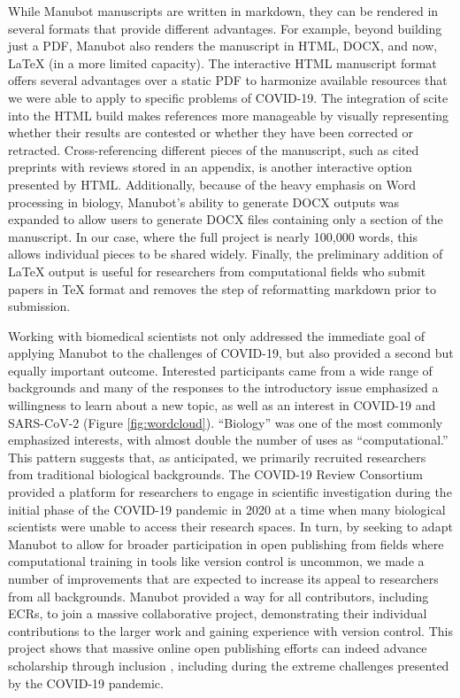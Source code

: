 \documentclass[sigconf]{acmart}
\begin{document}
While Manubot manuscripts are written in markdown, they can be rendered in several formats that provide different advantages.
For example, beyond building just a PDF, Manubot also renders the manuscript in HTML, DOCX, and now, LaTeX (in a more limited capacity).
The interactive HTML manuscript format offers several advantages over a static PDF to harmonize available resources that we were able to apply to specific problems of COVID-19.
The integration of scite into the HTML build makes references more manageable by visually representing whether their results are contested or whether they have been corrected or retracted.
Cross-referencing different pieces of the manuscript, such as cited preprints with reviews stored in an appendix, is another interactive option presented by HTML.
Additionally, because of the heavy emphasis on Word processing in biology, Manubot's ability to generate DOCX outputs was expanded to allow users to generate DOCX files containing only a section of the manuscript.
In our case, where the full project is nearly 100,000 words, this allows individual pieces to be shared widely.
Finally, the preliminary addition of LaTeX output is useful for researchers from computational fields who submit papers in TeX format and removes the step of reformatting markdown prior to submission.

Working with biomedical scientists not only addressed the immediate goal of applying Manubot to the challenges of COVID-19, but also provided a second but equally important outcome.
Interested participants came from a wide range of backgrounds and many of the responses to the introductory issue emphasized a willingness to learn about a new topic, as well as an interest in COVID-19 and SARS-CoV-2 (Figure \ref{fig:wordcloud}).
``Biology'' was one of the most commonly emphasized interests, with almost double the number of uses as ``computational.''
This pattern suggests that, as anticipated, we primarily recruited researchers from traditional biological backgrounds.
The COVID-19 Review Consortium provided a platform for researchers to engage in scientific investigation during the initial phase of the COVID-19 pandemic in 2020 at a time when many biological scientists were unable to access their research spaces.
In turn, by seeking to adapt Manubot to allow for broader participation in open publishing from fields where computational training in tools like version control is uncommon, we made a number of improvements that are expected to increase its appeal to researchers from all backgrounds.
Manubot provided a way for all contributors, including ECRs, to join a massive collaborative project, demonstrating their individual contributions to the larger work and gaining experience with version control.
This project shows that massive online open publishing efforts can indeed advance scholarship through inclusion \citep{PoDz2q0A}, including during the extreme challenges presented by the COVID-19 pandemic.
\end{document}
